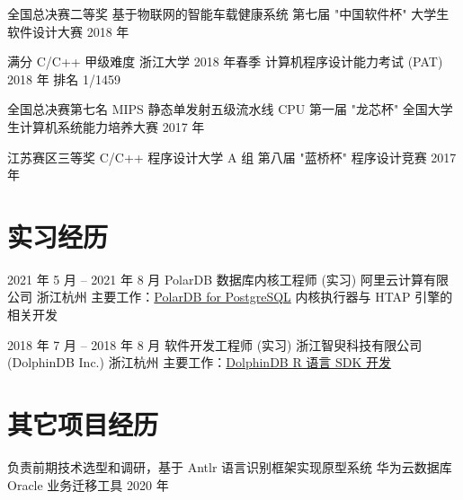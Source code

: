 \documentclass[11pt,a4paper,sans]{moderncv}   %
\begin{document}
\begin{CJK}{UTF8}{gbsn}
\cventry
{全国总决赛二等奖}
{基于物联网的智能车载健康系统}
{第七届 "中国软件杯" 大学生软件设计大赛}
{2018 年}
{}
{%
}

\cventry
{满分}
{C/C++ 甲级难度}
{浙江大学 2018 年春季 计算机程序设计能力考试 (PAT)}
{2018 年}
{}{排名 1/1459 \newline{}}

\cventry
{全国总决赛第七名}
{MIPS 静态单发射五级流水线 CPU}
{第一届 "龙芯杯" 全国大学生计算机系统能力培养大赛}
{2017 年}
{}{%
}

\cventry
{江苏赛区三等奖}
{C/C++ 程序设计大学 A 组}
{第八届 "蓝桥杯" 程序设计竞赛}
{2017 年}{}{}


\section{实习经历}

\cventry
{2021 年 5 月 -- 2021 年 8 月}
{PolarDB 数据库内核工程师 (实习)}
{阿里云计算有限公司}
{浙江杭州}
{}{主要工作：\href{https://github.com/ApsaraDB/PolarDB-for-PostgreSQL}{PolarDB for PostgreSQL} 内核执行器与 HTAP 引擎的相关开发}

\cventry
{2018 年 7 月 -- 2018 年 8 月}
{软件开发工程师 (实习)}
{浙江智臾科技有限公司 (DolphinDB Inc.)}
{浙江杭州}
{}{主要工作：\href{https://github.com/dolphindb/api-r}{DolphinDB R 语言 SDK 开发}}


\section{其它项目经历}

\cventry{}
{负责前期技术选型和调研，基于 Antlr 语言识别框架实现原型系统}
{华为云数据库 Oracle 业务迁移工具}
{2020 年}{}{}


\end{CJK}
\end{document}
